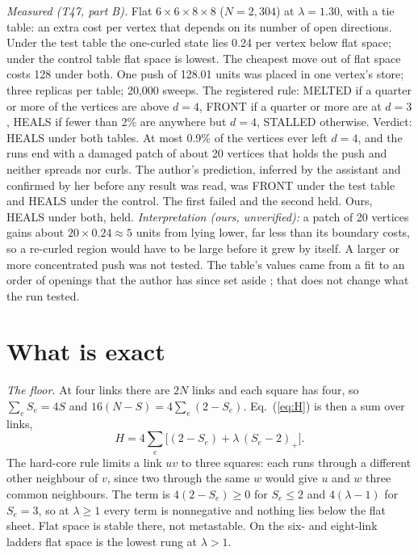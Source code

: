 \documentclass[aps,pre,10pt,twocolumn,superscriptaddress,nofootinbib]{revtex4-2}
\begin{document}
\emph{Measured (T47, part B).} Flat $6 \times 6 \times 8 \times 8$ ($N = 2{,}304$) at $\lambda = 1.30$, with a tie
table: an extra cost per vertex that depends on its number of open directions. Under the test table the one-curled
state lies 0.24 per vertex below flat space; under the control table flat space is lowest. The cheapest move out of
flat space costs 128 under both. One push of 128.01 units was placed in one vertex's store; three replicas per
table; 20,000 sweeps. The registered rule: MELTED if a quarter or more of the vertices are above $d = 4$, FRONT if a
quarter or more are at $d = 3$, HEALS if fewer than 2\% are anywhere but $d = 4$, STALLED otherwise. Verdict: HEALS
under both tables. At most 0.9\% of the vertices ever left $d = 4$, and the runs end with a damaged patch of about
20 vertices that holds the push and neither spreads nor curls. The author's prediction, inferred by the assistant
and confirmed by her before any result was read, was FRONT under the test table and HEALS under the control. The
first failed and the second held. Ours, HEALS under both, held. \emph{Interpretation (ours, unverified):} a patch of
20 vertices gains about $20 \times 0.24 \approx 5$ units from lying lower, far less than its boundary costs, so a re-curled region would have
to be large before it grew by itself. A larger or more concentrated push was not tested. The table's values came
from a fit to an order of openings that the author has since set aside \cite{repo}; that does not change what the
run tested.

\section{What is exact}\label{sec:exact}

\emph{The floor.} At four links there are $2N$ links and each square has four, so $\sum_e S_e = 4S$ and
$16(N - S) = 4\sum_e (2 - S_e)$. Eq.~(\ref{eq:H}) is then a sum over links,
\begin{equation}
  H = 4\sum_e \bigl[(2 - S_e) + \lambda\,(S_e - 2)_+\bigr] . \label{eq:Hlink}
\end{equation}
The hard-core rule limits a link $uv$ to three squares: each runs through a different other neighbour of $v$,
since two through the same $w$ would give $u$ and $w$ three common neighbours. The term is $4(2 - S_e) \geq 0$ for $S_e \leq 2$ and $4(\lambda - 1)$
for $S_e = 3$, so at $\lambda \geq 1$ every term is nonnegative and nothing lies below the flat sheet. Flat space
is stable there, not metastable. On the six- and eight-link ladders flat space is the lowest rung at $\lambda > 1$.
\end{document}
